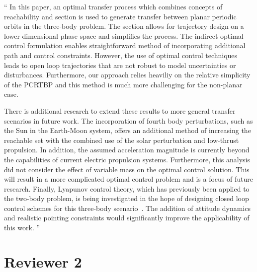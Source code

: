 \documentclass[11pt]{article}
\newenvironment{correction}{\begin{list}{}{\setlength{\leftmargin}{1cm}\setlength{\rightmargin}{1cm}}\vspace{\parsep}\item[]``}{''\end{list}}
\begin{document}
\begin{enumerate}
\begin{correction}
In this paper, an optimal transfer process which combines concepts of reachability and \Poincare section is used to generate transfer between planar periodic orbits in the three-body problem.
The \Poincare section allows for trajectory design on a lower dimensional phase space and simplifies the process.
The indirect optimal control formulation enables straightforward method of incorporating additional path and control constraints.
However, the use of optimal control techniques leads to open loop trajectories that are not robust to model uncertainties or disturbances.
Furthermore, our approach relies heaviliy on the relative simplicity of the PCRTBP and this method is much more challenging for the non-planar case.

There is additional research to extend these results to more general transfer scenarios in future work.
The incorporation of fourth body perturbations, such as the Sun in the Earth-Moon system, offers an additional method of increasing the reachable set with the combined use of the solar perturbation and low-thrust propulsion.
In addition, the assumed acceleration magnitude is currently beyond the capabilities of current electric propulsion systems.
Furthermore, this analysis did not consider the effect of variable mass on the optimal control solution.
This will result in a more complicated optimal control problem and is a focus of future research.
Finally, Lyapunov control theory, which has previously been applied to the two-body problem, is being investigated in the hope of designing closed loop control schemes for this three-body scenario~\cite{chang2002}.
The addition of attitude dynamics and realistic pointing constraints would significantly improve the applicability of this work.
\end{correction}
\end{enumerate}

\section*{Reviewer 2}
\end{document}
